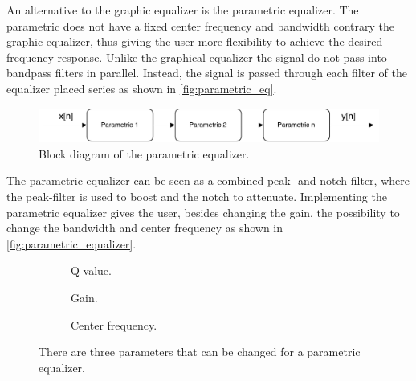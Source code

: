 An alternative to the graphic equalizer is the parametric equalizer. The parametric does not have a fixed center frequency and bandwidth contrary the graphic equalizer, thus giving the user more flexibility to achieve the desired frequency response. Unlike the graphical equalizer the signal do not pass into bandpass filters in parallel. Instead, the signal is passed through each filter of the equalizer placed series as shown in \autoref{fig:parametric_eq}. \\

\begin{figure}[H]
\centering
\includegraphics[width=0.8 \textwidth]{figures/parametric_eq.pdf}
\caption{Block diagram of the parametric equalizer.}
\label{fig:parametric_eq}
\end{figure}

The parametric equalizer can be seen as a combined peak- and notch filter, where the peak-filter is used to boost and the notch to attenuate. Implementing the parametric equalizer gives the user, besides changing the gain, the possibility to change the bandwidth and center frequency as shown in \autoref{fig:parametric_equalizer}.

\begin{figure}[H]
\centering
\hspace*{-1cm}
\begin{subfigure}[t]{0.3\textwidth}
	
	\caption{Q-value.}
	\label{fig:parametric_q}
\end{subfigure}
\hspace{2mm} 
\begin{subfigure}[t]{0.3\textwidth}
	
	\caption{Gain.}
	\label{fig:parametric_db}
\end{subfigure}
\hspace{2mm}
\begin{subfigure}[t]{0.3\textwidth}
	
	\caption{Center frequency.}
	\label{fig:parametric_fc}
\end{subfigure}
\caption{There are three parameters that can be changed for a parametric equalizer.}
\label{fig:parametric_equalizer}
\end{figure}

